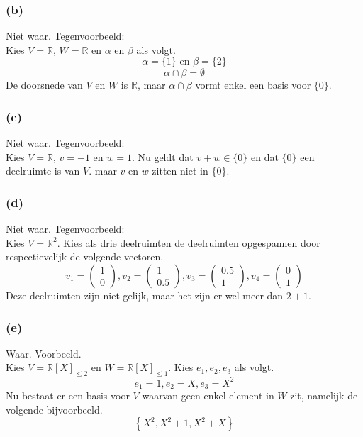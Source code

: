 \documentclass[lineaire_algebra_oplossingen.tex]{subfiles}
\begin{document}
\subsubsection*{(b)}
Niet waar. Tegenvoorbeeld:\\
Kies $V = \mathbb{R}$, $W=\mathbb{R}$ en $\alpha$ en $\beta$ als volgt.
\[
\alpha = \{1\} \text{ en } \beta = \{2\}
\]
\[
\alpha \cap \beta = \emptyset
\]
De doorsnede van $V$ en $W$ is $\mathbb{R}$, maar $\alpha \cap \beta$ vormt enkel een basis voor $\{0\}$.

\subsubsection*{(c)}
Niet waar. Tegenvoorbeeld:\\
Kies $V= \mathbb{R}$, $v=-1$ en $w=1$.
Nu geldt dat $v+w \in \{0\}$ en dat $\{0\}$ een deelruimte is van $V$. maar $v$ en $w$ zitten niet in $\{0\}$.

\subsubsection*{(d)}
Niet waar. Tegenvoorbeeld:\\
Kies $V = \mathbb{R}^{2}$. Kies als drie deelruimten de deelruimten opgespannen door respectievelijk de volgende vectoren.
\[
v_1 = 
\begin{pmatrix}
1\\0
\end{pmatrix}
,
v_2 = 
\begin{pmatrix}
1\\0.5
\end{pmatrix}
,
v_3 = 
\begin{pmatrix}
0.5\\1
\end{pmatrix}
,
v_4 = 
\begin{pmatrix}
0\\1
\end{pmatrix}
\]
Deze deelruimten zijn niet gelijk, maar het zijn er wel  meer dan $2+1$.

\subsubsection*{(e)}
Waar. Voorbeeld.\\
Kies $V = \mathbb{R}[X]_{\le 2}$ en $W = \mathbb{R}[X]_{\le 1}$.
Kies $e_1,e_2,e_3$ als volgt. 
\[
e_1 = 1, e_2 = X, e_3= X^2
\]
Nu bestaat er een basis voor $V$ waarvan geen enkel element in $W$ zit, namelijk de volgende bijvoorbeeld.
\[
\left\{
X^2, X^2+1, X^2+X
\right\}
\]
\end{document}
